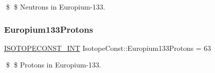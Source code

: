 \$ \$ Neutrons in Europium-\/133. \mbox{\label{group___isotope_const-_europium-_eu133_gac296be717cfb33644b5f0a8eb45e60e5}} 
\subsubsection{\texorpdfstring{Europium133\+Protons}{Europium133Protons}}
{\footnotesize\ttfamily \mbox{\hyperlink{group___isotope_const-_macros_ga5f18360b3e99483a35c32d789e62621c}{I\+S\+O\+T\+O\+P\+E\+C\+O\+N\+S\+T\+\_\+\+I\+NT}} Isotope\+Const\+::\+Europium133\+Protons = 63}

\$ \$ Protons in Europium-\/133. 